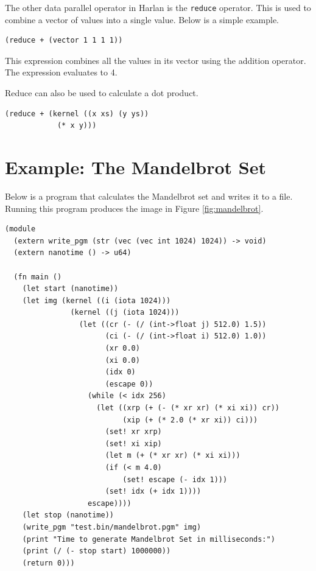 \documentclass[oneside]{report}
\begin{document}
The other data parallel operator in Harlan is the \lstinline{reduce}
operator. This is used to combine a vector of values into a single
value. Below is a simple example.

\begin{lstlisting}
(reduce + (vector 1 1 1 1))  
\end{lstlisting}

This expression combines all the values in its vector using the
addition operator. The expression evaluates to 4.

Reduce can also be used to calculate a dot product.

\begin{lstlisting}
(reduce + (kernel ((x xs) (y ys))
            (* x y)))
\end{lstlisting}

\section{Example: The Mandelbrot Set}

Below is a program that calculates the Mandelbrot set and writes it to
a file.  Running this program produces the image in Figure
\ref{fig:mandelbrot}.

\begin{lstlisting}
(module
  (extern write_pgm (str (vec (vec int 1024) 1024)) -> void)
  (extern nanotime () -> u64)
  
  (fn main ()
    (let start (nanotime))
    (let img (kernel ((i (iota 1024)))
               (kernel ((j (iota 1024)))
                 (let ((cr (- (/ (int->float j) 512.0) 1.5))
                       (ci (- (/ (int->float i) 512.0) 1.0))
                       (xr 0.0)
                       (xi 0.0)
                       (idx 0)
                       (escape 0))
                   (while (< idx 256)
                     (let ((xrp (+ (- (* xr xr) (* xi xi)) cr))
                           (xip (+ (* 2.0 (* xr xi)) ci)))
                       (set! xr xrp)
                       (set! xi xip)
                       (let m (+ (* xr xr) (* xi xi)))
                       (if (< m 4.0)
                           (set! escape (- idx 1)))
                       (set! idx (+ idx 1))))
                   escape))))
    (let stop (nanotime))
    (write_pgm "test.bin/mandelbrot.pgm" img)
    (print "Time to generate Mandelbrot Set in milliseconds:")
    (print (/ (- stop start) 1000000))
    (return 0)))  
\end{lstlisting}
\end{document}
